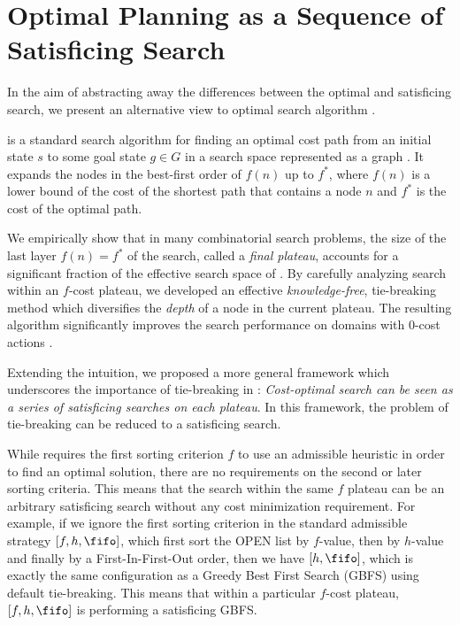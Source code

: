 \section{Optimal Planning as a Sequence of Satisficing Search}

\label{sec:opt}

In the aim of abstracting away the differences between the optimal and satisficing search,
we present an alternative view to optimal search algorithm \astar \cite{asai2017tie}.
 
\astar is a standard search algorithm for finding an optimal cost path from an initial state $s$ to
some goal state $g \in G$ in a search space represented as a graph \cite{hart1968formal}.
It expands the nodes in the best-first order of $f(n)$ up to $f^*$, where $f(n)$ is a lower bound of the
cost of the shortest path that contains a node $n$ and $f^*$ is the cost of the optimal path.

We empirically show that in many combinatorial search problems, the size of the last layer
$f(n)=f^*$ of the search, called a \emph{final plateau}, accounts for a significant fraction of the
effective search space of \astar.  By carefully analyzing search within an $f$-cost plateau, we
developed an effective {\it knowledge-free}, tie-breaking method which diversifies the \emph{depth}
of a node in the current plateau.  The resulting algorithm significantly improves the search
performance on domains with 0-cost actions \cite{Asai2016}. 

Extending the intuition, we proposed a more general framework which underscores the importance of
tie-breaking in \astar: \emph{Cost-optimal search can be seen as a series of satisficing searches on
each plateau}. In this framework, the problem of tie-breaking can be reduced to a
satisficing search.

While \astar requires the first sorting criterion $f$ to use an admissible heuristic in order to
find an optimal solution, there are no requirements on the second or later sorting criteria.
This means that the search within the same $f$ plateau can be an arbitrary satisficing
search without any cost minimization requirement. For example, if we ignore the first sorting
criterion in the standard admissible strategy $[f,h,\fifo]$, which first sort the OPEN list by
$f$-value, then by $h$-value and finally by a First-In-First-Out order, then we have $[h,\fifo]$, which
is exactly the same configuration as a Greedy Best First Search (GBFS) using \fifo default
tie-breaking. This means that within a particular $f$-cost plateau, $[f,h,\fifo]$ is performing a
satisficing GBFS.

